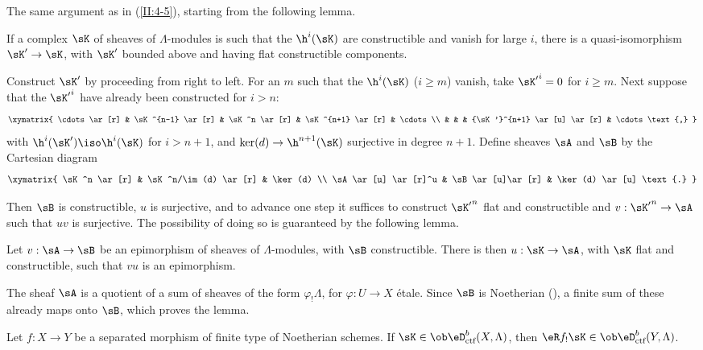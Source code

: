 \documentclass[oneside]{book}
\begin{document}
The same argument as in (\ref{II:4-5}), starting from the following lemma.






\begin{lemma_}\label{II:4-7}
If a complex $\sK$ of sheaves of $\Lambda$-modules is such that the
$\h^i(\sK)$ are constructible and vanish for large $i$, there is a
quasi-isomorphism $\sK'\to \sK$, with $\sK'$ bounded above and having flat
constructible components.
\end{lemma_}

Construct $\sK'$ by proceeding from right to left. For an $m$ such that the
$\h^i(\sK)$ ($i\geqslant m$) vanish, take ${\sK'}^i = 0$ for
$i\geqslant m$. Next suppose that the ${\sK'}^i$ have already been
constructed for $i>n$:
\[\xymatrix{
  \cdots \ar[r]
    & \sK^{n-1} \ar[r]
    & \sK^n \ar[r]
    & \sK^{n+1} \ar[r]
    & \cdots \\
  & & & {\sK'}^{n+1} \ar[u] \ar[r]
    & \cdots \text{,}
}\]
with $\h^i(\sK')\iso \h^i(\sK)$ for $i>n+1$, and
$\ker(d)\to\h^{n+1}(\sK)$ surjective in degree $n+1$. Define sheaves $\sA$
and $\sB$ by the Cartesian diagram
\[\xymatrix{
  \sK^n \ar[r]
    & \sK^n/\im(d) \ar[r]
    & \ker(d) \\
  \sA \ar[u] \ar[r]^u
    & \sB \ar[u]\ar[r]
    & \ker(d) \ar[u] \text{.}
}\]

Then $\sB$ is constructible, $u$ is surjective, and to advance one step it
suffices to construct ${\sK'}^n$ flat and constructible and
$v:{\sK'}^n\to \sA$ such that $u v$ is surjective. The possibility of doing so
is guaranteed by the following lemma.






\begin{lemma_}\label{II:4-8}
Let $v:\sA\to \sB$ be an epimorphism of sheaves of $\Lambda$-modules, with
$\sB$ constructible. There is then $u:\sK\to \sA$, with $\sK$ flat and
constructible, such that $v u$ is an epimorphism.
\end{lemma_}

The sheaf $\sA$ is a quotient of a sum of sheaves of the form
$\varphi_! \Lambda$, for $\varphi:U\to X$ étale. Since $\sB$ is Noetherian
(\cite[IX.2.10]{sga4}), a finite sum of these already maps onto $\sB$, which
proves the lemma.






\begin{theorem_}\label{II:4-9}
Let $f:X\to Y$ be a separated morphism of finite type of Noetherian schemes.
If $\sK\in\ob\eD_\textnormal{ctf}^b(X,\Lambda)$, then
$\eR f_!\sK\in \ob\eD_\textnormal{ctf}^b(Y,\Lambda)$.
\end{theorem_}
\end{document}
